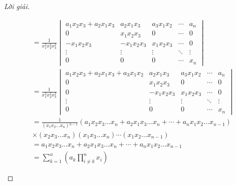\begin{proof}[Lời giải]
\begin{enumerate}[label = (\alph*)]
\begin{align*}
                   & = \frac{1}{x^{2}_{1}x^{2}_{2}x^{2}_{3}}
                  \begin{vmatrix}
                      a_{1}x_{2}x_{3} + a_{2}x_{1}x_{3} & a_{2}x_{1}x_{3}  & a_{3}x_{1}x_{2} & \cdots & a_{n}  \\
                      0                                 & x_{1}x_{2}x_{3}  & 0               & \cdots & 0      \\
                      -x_{1}x_{2}x_{3}                  & -x_{1}x_{2}x_{3} & x_{1}x_{2}x_{3} & \cdots & 0      \\
                      \vdots                            & \vdots           & \vdots          & \ddots & \vdots \\
                      0                                 & 0                & 0               & \cdots & x_{n}
                  \end{vmatrix}                                                            \\
                   & = \frac{1}{x^{2}_{1}x^{2}_{2}x^{2}_{3}}
                  \begin{vmatrix}
                      a_{1}x_{2}x_{3} + a_{2}x_{1}x_{3} + a_{3}x_{1}x_{2} & a_{2}x_{1}x_{3}  & a_{3}x_{1}x_{2} & \cdots & a_{n}  \\
                      0                                                   & x_{1}x_{2}x_{3}  & 0               & \cdots & 0      \\
                      0                                                   & -x_{1}x_{2}x_{3} & x_{1}x_{2}x_{3} & \cdots & 0      \\
                      \vdots                                              & \vdots           & \vdots          & \ddots & \vdots \\
                      0                                                   & 0                & 0               & \cdots & x_{n}
                  \end{vmatrix}                                          \\
                   & = \frac{1}{(x_{1}x_{2}\ldots x_{n}){}^{n-1}}(a_{1}x_{2}x_{3}\ldots x_{n} + a_{2}x_{1}x_{3}\ldots x_{n} + \cdots + a_{n}x_{1}x_{2}\ldots x_{n-1}) \\
                   & \times (x_{2}x_{3}\ldots x_{n}) (x_{1}x_{3}\ldots x_{n}) \cdots (x_{1}x_{2}\ldots x_{n-1})                                                       \\
                   & = a_{1}x_{2}x_{3}\ldots x_{n} + a_{2}x_{1}x_{3}\ldots x_{n} + \cdots + a_{n}x_{1}x_{2}\ldots x_{n-1}                                             \\
                   & = \sum^{n}_{k = 1}\left(a_{k}\prod^{n}_{i\ne k}x_{i}\right)
              \end{align*}
              \endgroup{}
    \end{enumerate}
\end{proof}

